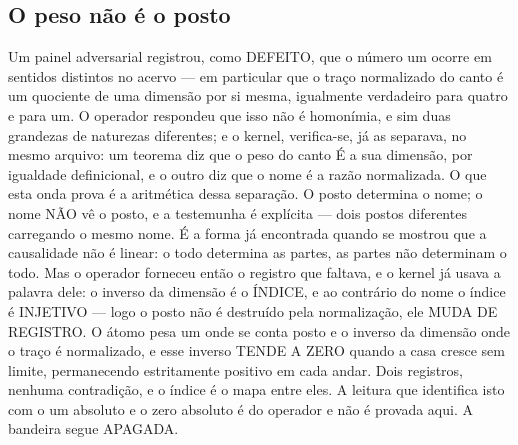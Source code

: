 \documentclass[11pt]{article}
\theoremstyle{definition}\newtheorem{deriv}{Derivação}
\begin{document}
\subsection*{O peso n\~ao \'e o posto}Um painel adversarial registrou, como DEFEITO, que o n\'umero um ocorre em sentidos distintos no acervo --- em particular que o tra\c{c}o normalizado do canto \'e um quociente de uma dimens\~ao por si mesma, igualmente verdadeiro para quatro e para um. O operador respondeu que isso n\~ao \'e homon\'imia, e sim duas grandezas de naturezas diferentes; e o kernel, verifica-se, j\'a as separava, no mesmo arquivo: um teorema diz que o peso do canto \'E a sua dimens\~ao, por igualdade definicional, e o outro diz que o nome \'e a raz\~ao normalizada. O que esta onda prova \'e a aritm\'etica dessa separa\c{c}\~ao. O posto determina o nome; o nome N\~AO v\^e o posto, e a testemunha \'e expl\'icita --- dois postos diferentes carregando o mesmo nome. \'E a forma j\'a encontrada quando se mostrou que a causalidade n\~ao \'e linear: o todo determina as partes, as partes n\~ao determinam o todo. Mas o operador forneceu ent\~ao o registro que faltava, e o kernel j\'a usava a palavra dele: o inverso da dimens\~ao \'e o \'INDICE, e ao contr\'ario do nome o \'indice \'e INJETIVO --- logo o posto n\~ao \'e destru\'ido pela normaliza\c{c}\~ao, ele MUDA DE REGISTRO. O \'atomo pesa um onde se conta posto e o inverso da dimens\~ao onde o tra\c{c}o \'e normalizado, e esse inverso TENDE A ZERO quando a casa cresce sem limite, permanecendo estritamente positivo em cada andar. Dois registros, nenhuma contradi\c{c}\~ao, e o \'indice \'e o mapa entre eles. A leitura que identifica isto com o um absoluto e o zero absoluto \'e do operador e n\~ao \'e provada aqui. A bandeira segue APAGADA.
\end{document}
